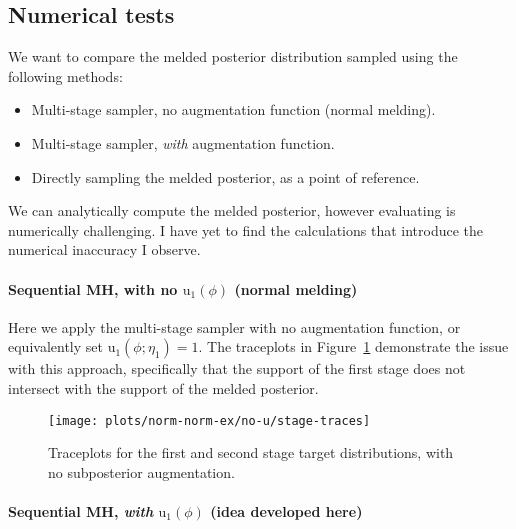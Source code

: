 \documentclass[10pt,a4paper,]{article}
\providecommand{\tightlist}{%
  \setlength{\itemsep}{0pt}\setlength{\parskip}{0pt}}
\let\oldparagraph\paragraph
\renewcommand{\paragraph}[1]{\oldparagraph{#1}\mbox{}}
\newcommand{\tarw}{\text{u}}
\begin{document}
\subsection{Numerical tests}\label{numerical-tests}

We want to compare the melded posterior distribution sampled using the
following methods:

\begin{itemize}
\tightlist
\item
  Multi-stage sampler, no augmentation function (normal melding).
\item
  Multi-stage sampler, \emph{with} augmentation function.
\item
  Directly sampling the melded posterior, as a point of reference.
\end{itemize}

We can analytically compute the melded posterior, however evaluating is
numerically challenging. I have yet to find the calculations that
introduce the numerical inaccuracy I observe.

\paragraph{\texorpdfstring{Sequential MH, with no \(\text{u}_{1}(\phi)\)
(normal
melding)}{Sequential MH, with no \textbackslash{}text\{u\}\_\{1\}(\textbackslash{}phi) (normal melding)}}\label{sequential-mh-with-no-textu_1phi-normal-melding}

Here we apply the multi-stage sampler with no augmentation function, or
equivalently set \(\tarw_{1}(\phi; \eta_{1}) = 1\). The traceplots in
Figure~\ref{fig:no_u_traces} demonstrate the issue with this approach,
specifically that the support of the first stage does not intersect with
the support of the melded posterior.

\begin{figure}

{\centering \texttt{[image: plots/norm-norm-ex/no-u/stage-traces]} 

}

\caption{Traceplots for the first and second stage target distributions, with no subposterior augmentation.}\label{fig:no_u_traces}
\end{figure}

\paragraph{\texorpdfstring{Sequential MH, \emph{with}
\(\text{u}_{1}(\phi)\) (idea developed
here)}{Sequential MH, with \textbackslash{}text\{u\}\_\{1\}(\textbackslash{}phi) (idea developed here)}}\label{sequential-mh-with-textu_1phi-idea-developed-here}
\end{document}
